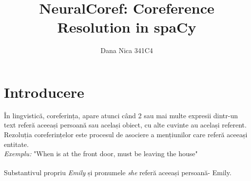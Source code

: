 \documentclass[letterpaper,12pt, dvipsnames, dateno]{article}
\begin{document}
\title{NeuralCoref: Coreference Resolution in spaCy}
\author{Dana Nica 341C4}
\date{}
\maketitle






\section{Introducere}
În lingvistică, coreferința, apare atunci când 2 sau mai multe expresii dintr-un text referă aceeași persoană sau același obiect, cu alte cuvinte au același referent. Rezoluția coreferințelor este procesul de asociere a mențiunilor care referă aceeași entitate. \\

\textit{Exemplu:} "When  is at the front door,  must be leaving the house" \\ \\
Substantivul propriu \textit{Emily} și pronumele \textit{she} referă aceeași persoană- Emily.\\
\end{document}
